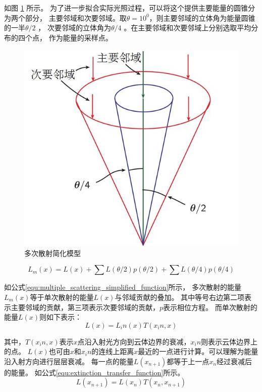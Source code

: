 如图 \ref{fig:multiple_scattering_simplified_model} 所示。
为了进一步拟合实际光照过程，可以将这个提供主要能量的圆锥分为两个部分，
主要邻域和次要邻域。取$\theta{}=10^0$，则主要邻域的立体角为能量圆锥的一半$\theta{}/2$ ，
次要邻域的立体角为$\theta{}/4$ 。在主要邻域和次要邻域上分别选取平均分布的四个点，
作为能量的采样点。

\begin{figure}
\centering
\includegraphics{figure/multiple_scattering_simplified_model.jpg}
\caption{多次散射简化模型}
\label{fig:multiple_scattering_simplified_model}
\end{figure}

\begin{equation}
\label{equ:multiple_scattering_simplified_function}
L_m(x)=L(x) + \sum{}L(\theta{}/2)p(\theta{}/2) + \sum{}L(\theta{}/4)p(\theta{}/4)
\end{equation}

如公式\ref{equ:multiple_scattering_simplified_function}所示，
多次散射的能量$L_m(x)$等于单次散射的能量$L(x)$与邻域贡献的叠加。
其中等号右边第二项表示主要邻域的贡献，第三项表示次要邻域的贡献，$p$表示相位方程。
而单次散射的能量$L(x)$则如下表示：
\begin{equation}
\label{equ:illumination}
L(x)=L_in(x)T(x_in,x)
\end{equation}

其中，$T(x_in,x)$表示$x$点沿入射光方向到云体边界的衰减，$x_in$则表示云体边界上的点。
$L(x)$也可由$x$和$x_in$的连线上距离$x$最近的一点进行计算。可以理解为能量沿入射方向进行层层衰减。
每一点的能量$L(x_{n+1})$都等于上一点$x_n$经过衰减后的能量。
如公式\ref{equ:extinction_transfer_function}所示。
\begin{equation}
\label{equ:extinction_transfer_function}
L(x_{n+1})=L(x_n)T(x_n,x_{n+1})
\end{equation}

